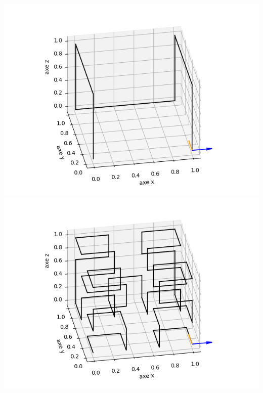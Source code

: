 \documentclass[11pt,class=report,crop=false]{standalone}
\begin{document}
\begin{center}
\includegraphics[scale=\myscale,scale=0.4]{figures/hilbert-1}\qquad
\includegraphics[scale=\myscale,scale=0.4]{figures/hilbert-2}\qquad


\end{center}
\end{document}
